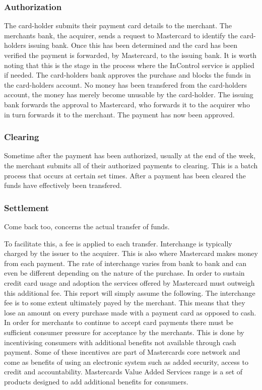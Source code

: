 \documentclass[a4paper, 11pt, titlepage]{article}
\begin{document}
\subsubsection{Authorization} The card-holder submits their payment card details to the merchant. The merchants bank, the acquirer, sends a request to Mastercard to identify the card-holders issuing bank. Once this has been determined and the card has been verified the payment is forwarded, by Mastercard, to the issuing bank. It is worth noting that this is the stage in the process where the InControl service is applied if needed. The card-holders bank approves the purchase and blocks the funds in the card-holders account. No money has been transfered from the card-holders account, the money has merely become unusable by the card-holder. The issuing bank forwards the approval to Mastercard, who forwards it to the acquirer who in turn forwards it to the merchant. The payment has now been approved. 
\subsubsection{Clearing} Sometime after the payment has been authorized, usually at the end of the week, the merchant submits all of their authorized payments to clearing. This is a batch process that occurs at certain set times. After a payment has been cleared the funds have effectively been transfered.
\subsubsection{Settlement} Come back too, concerns the actual transfer of funds.

To facilitate this, a fee is applied to each transfer. Interchange is typically charged by the issuer to the acquirer. This is also where Mastercard makes money from each payment. The rate of interchange varies from bank to bank and can even be different depending on the nature of the purchase. In order to sustain credit card usage and adoption the services offered by Mastercard must outweigh this additional fee. This report will simply assume the following. The interchange fee is to some extent ultimately payed by the merchant. This means that they lose an amount on every purchase made with a payment card as opposed to cash. In order for merchants to continue to accept card payments there must be sufficient consumer pressure for acceptance by the merchants. This is done by incentivising consumers with additional benefits not available through cash payment. Some of these incentives are part of Mastercards core network and come as benefits of using an electronic system such as added security, access to credit and accountability. Mastercards Value Added Services range is a set of products designed to add additional benefits for consumers.
\cite{Something about 4 party, also check I have it the right way around http://tinyurl.com/7bbdq4
 }
\end{document}
